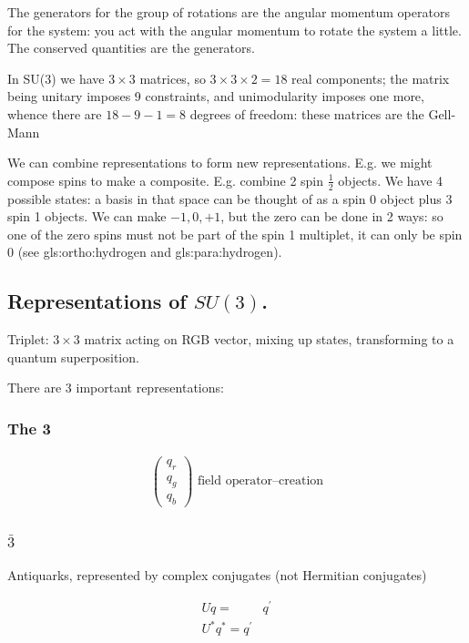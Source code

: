 \documentclass[]{article}
\begin{document}
The generators for the group of rotations are the angular momentum operators for the system: you act with the angular momentum to rotate the system a little. The conserved quantities are the generators.

In SU(3) we have $3\times3$ matrices, so $3\times3\times2=18$ real components; the matrix being unitary imposes 9 constraints, and unimodularity imposes one more, whence there are $18-9-1=8$ degrees of freedom: these matrices are the Gell-Mann 

We can combine representations to form new representations. E.g. we might compose spins to make a composite. E.g. combine 2 spin $\frac{1}{2}$ objects. We have 4 possible states: a basis in that space can be thought of as a spin 0 object plus 3 spin 1 objects. We can make ${-1,0,+1}$, but the zero can be done in 2 ways: so one of the zero spins must not be part of the spin 1 multiplet, it can only be spin 0 (see \gls{gls:ortho:hydrogen} and \gls{gls:para:hydrogen}).

\subsection{Representations of $SU(3)$.}

Triplet: $3\times3$ matrix acting on RGB vector, mixing up states, transforming to a quantum superposition.

There are 3 important representations: 

\subsubsection{The \bfseries{3}}

\begin{align*}
	\begin{pmatrix}
		q_r\\
		q_g\\
		q_b
	\end{pmatrix} \text{ field operator--creation}
\end{align*} 

\subsubsection{$\bar{3}$}

Antiquarks, represented by complex conjugates (not Hermitian conjugates)

\begin{align*}
	U q =& q^\prime\\
	U^* q^* = q^\prime& 
\end{align*}
\end{document}
